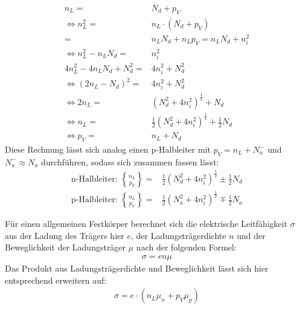 \begin{align*}
 n_L =& N_d + p_V \\
\Leftrightarrow  n_L^2 =& n_L \cdot (N_d +p_V) \\
 =& n_L N_d + n_L p_V = n_L N_d + n_i^2 \\
\Leftrightarrow  n_L^2-n_L N_d =& n_i^2 \\
4n_L^2-4n_L N_d + N_d^2 =& 4n_i^2 + N_d^2 \\
\Leftrightarrow (2n_L-N_d)^2 =& 4n_i^2+ N_d^2 \\
\Leftrightarrow 2n_L =& (N_d^2+4n_i^2)^{\frac{1}{2}} +N_d \\
\Leftrightarrow n_L =& \frac{1}{2}(N_d^2+4n_i^2)^{\frac{1}{2}} +\frac{1}{2} N_d \\
\Leftrightarrow p_V =& n_L + N_d
\end{align*}
Diese Rechnung lässt sich analog einen p-Halbleiter mit \(p_V = n_L + N_a^-\) und \(N_a^-\approx N_a\) durchführen, sodass sich zusammen fassen lässt:
\begin{align}
\text{n-Halbleiter:   }
\genfrac{\{}{\}}{0pt}{}{n_L}{p_V} =& \frac{1}{2}(N_d^2+4n_i^2)^{\frac{1}{2}} \pm \frac{1}{2} N_d \\
\text{p-Halbleiter:   }
\genfrac{\{}{\}}{0pt}{}{n_L}{p_V} =& \frac{1}{2}(N_a^2+4n_i^2)^{\frac{1}{2}} \mp \frac{1}{2} N_a
\end{align}

Für einen allgemeinen Festkörper berechnet sich die elektrische Leitfähigkeit \(\sigma\) aus der Ladung des Trägers hier \(e\), der Ladungsträgerdichte \(n\) und der Beweglichkeit der Ladungsträger \(\mu\) nach der folgenden Formel:
\begin{align*}
\sigma = e n \mu
\end{align*}
Das Produkt aus Ladungsträgerdichte und Beweglichkeit lässt sich hier entsprechend erweitern auf:
\begin{align*}
\sigma = e \cdot(n_L \mu_n +p_V \mu_p)
\end{align*}

